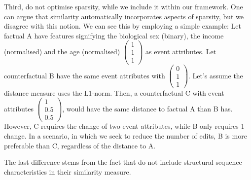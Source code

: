 \documentclass[./../../paper.tex]{subfiles}
\begin{document}
Third, \citeauthor{hsieh_DiCE4ELInterpretingProcess_2021} do not optimise sparsity, while we include it within our framework. One can argue that similarity automatically incorporates aspects of sparsity, but we disagree with this notion. We can see this by employing a simple example: Let factual A have features signifying the biological sex (binary), the income (normalised) and the age (normalised) $\begin{pmatrix}1\\1\\1\end{pmatrix}$ as event attributes. Let counterfactual B have the same event attributes with $\begin{pmatrix}0\\1\\1\end{pmatrix}$. Let's assume the distance measure uses the L1-norm. Then, a counterfactual C with event attributes $\begin{pmatrix}1\\0.5\\0.5\end{pmatrix}$, would have the same distance to factual A than B has. However, C requires the change of two event attributes, while B only requires 1 change. In a scenario, in which we seek to reduce the number of edits, B is more preferable than C, regardless of the distance to A.

The last difference stems from the fact that \citeauthor{hsieh_DiCE4ELInterpretingProcess_2021} do not include structural sequence characteristics in their similarity measure. 
\end{document}
